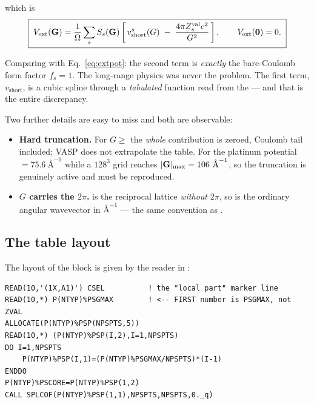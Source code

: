 which is
\begin{equation}
  \boxed{\;
  V_{\mathrm{ext}}(\mathbf{G}) = \frac{1}{\Omega}\sum_{s} S_s(\mathbf{G})
    \left[\, v^{s}_{\mathrm{short}}(G)
      \;-\; \frac{4\pi Z^{\mathrm{val}}_{s} e^{2}}{G^{2}} \,\right],
  \qquad V_{\mathrm{ext}}(\bm{0}) = 0 . \;}
  \label{eq:vaspextcar}
\end{equation}

Comparing with Eq.~\eqref{eq:extpot}: the second term is \emph{exactly} the
bare-Coulomb form factor $f_s = 1$. The long-range physics was never the
problem. The first term, $v_{\mathrm{short}}$, is a cubic spline through a
\emph{tabulated} function read from the  --- and that is the entire
discrepancy.

Two further details are easy to miss and both are observable:

\begin{itemize}
  \item \textbf{Hard truncation.} For $G \ge$  the \emph{whole}
    contribution is zeroed, Coulomb tail included; VASP does not extrapolate
    the table. For the platinum potential  $=75.6\ \text{\AA}^{-1}$
    while a $128^3$ grid reaches $|\GG|_{\max}=106\ \text{\AA}^{-1}$, so the
    truncation is genuinely active and must be reproduced.
  \item \textbf{$G$ carries the $2\pi$.}  is the reciprocal
    lattice \emph{without} $2\pi$, so  is the ordinary angular
    wavevector in $\text{\AA}^{-1}$ --- the same convention as
    .
\end{itemize}

\subsection{The \texorpdfstring{}{POTCAR} table layout}

The layout of the  block is given by the reader in
:

\begin{lstlisting}[style=fortran]
READ(10,'(1X,A1)') CSEL          ! the "local part" marker line
READ(10,*) P(NTYP)%PSGMAX        ! <-- FIRST number is PSGMAX, not ZVAL
ALLOCATE(P(NTYP)%PSP(NPSPTS,5))
READ(10,*) (P(NTYP)%PSP(I,2),I=1,NPSPTS)
DO I=1,NPSPTS
    P(NTYP)%PSP(I,1)=(P(NTYP)%PSGMAX/NPSPTS)*(I-1)
ENDDO
P(NTYP)%PSCORE=P(NTYP)%PSP(1,2)
CALL SPLCOF(P(NTYP)%PSP(1,1),NPSPTS,NPSPTS,0._q)
\end{lstlisting}

